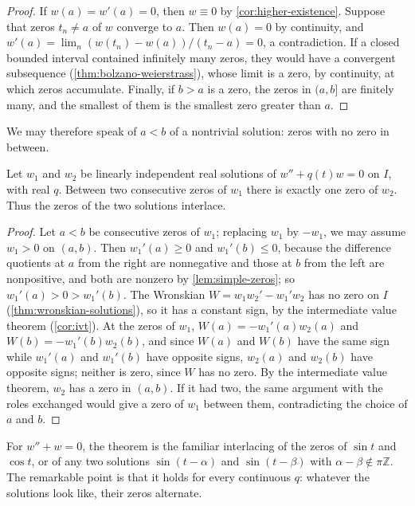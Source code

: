 \begin{proof}
If $w(a)=w'(a)=0$, then $w\equiv0$ by \cref{cor:higher-existence}. Suppose that zeros $t_n\ne a$ of $w$ converge to $a$. Then $w(a)=0$ by continuity, and $w'(a)=\lim_n(w(t_n)-w(a))/(t_n-a)=0$, a contradiction. If a closed bounded interval contained infinitely many zeros, they would have a convergent subsequence (\cref{thm:bolzano-weierstrass}), whose limit is a zero, by continuity, at which zeros accumulate. Finally, if $b>a$ is a zero, the zeros in $(a,b]$ are finitely many, and the smallest of them is the smallest zero greater than $a$.
\end{proof}

We may therefore speak of  $a<b$ of a nontrivial solution: zeros with no zero in between.

\begin{theorem}
\label{thm:sturm-separation}
Let $w_1$ and $w_2$ be linearly independent real solutions of $w''+q(t)w=0$ on $I$, with real $q$. Between two consecutive zeros of $w_1$ there is exactly one zero of $w_2$. Thus the zeros of the two solutions interlace.
\end{theorem}

\begin{proof}
Let $a<b$ be consecutive zeros of $w_1$; replacing $w_1$ by $-w_1$, we may assume $w_1>0$ on $(a,b)$. Then $w_1'(a)\ge0$ and $w_1'(b)\le0$, because the difference quotients at $a$ from the right are nonnegative and those at $b$ from the left are nonpositive, and both are nonzero by \cref{lem:simple-zeros}; so $w_1'(a)>0>w_1'(b)$. The Wronskian $W=w_1w_2'-w_1'w_2$ has no zero on $I$ (\cref{thm:wronskian-solutions}), so it has a constant sign, by the intermediate value theorem (\cref{cor:ivt}). At the zeros of $w_1$, $W(a)=-w_1'(a)w_2(a)$ and $W(b)=-w_1'(b)w_2(b)$, and since $W(a)$ and $W(b)$ have the same sign while $w_1'(a)$ and $w_1'(b)$ have opposite signs, $w_2(a)$ and $w_2(b)$ have opposite signs; neither is zero, since $W$ has no zero. By the intermediate value theorem, $w_2$ has a zero in $(a,b)$. If it had two, the same argument with the roles exchanged would give a zero of $w_1$ between them, contradicting the choice of $a$ and $b$.
\end{proof}

For $w''+w=0$, the theorem is the familiar interlacing of the zeros of $\sin t$ and $\cos t$, or of any two solutions $\sin(t-\alpha)$ and $\sin(t-\beta)$ with $\alpha-\beta\notin\pi\mathbb Z$. The remarkable point is that it holds for every continuous $q$: whatever the solutions look like, their zeros alternate.

